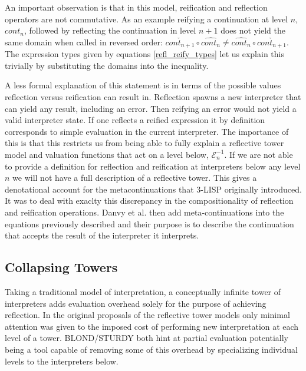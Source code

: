 \documentclass[fleqn]{article}
\theoremstyle{definition}
\begin{document}
An important observation is that in this model, reification and reflection operators are not commutative. As an example reifying a continuation at level $n$, $cont_n$, followed by reflecting the continuation in level $n+1$ does not yield the same domain when called in reversed order: $\check{cont_{n+1}} \circ \hat{cont_n} \neq \hat{cont_n} \circ \check{cont_{n+1}}$. The expression types given by equations \ref{refl_reify_types} let us explain this trivially by substituting the domains into the inequality.

%
%

A less formal explanation of this statement is in terms of the possible values reflection versus reification can result in. Reflection spawns a new interpreter that can yield any result, including an error. Then reifying an error would not yield a valid interpreter state. If one reflects a reified expression it by definition corresponds to simple evaluation in the current interpreter. The importance of this is that this restricts us from being able to fully explain a reflective tower model and valuation functions that act on a level below, $\mathcal{E}^{-1}_n$. If we are not able to provide a definition for reflection and reification at interpreters below any level $n$ we will not have a full description of a reflective tower. This gives a denotational account for the metacontinuations that 3-LISP originally introduced. It was to deal with exaclty this discrepancy in the compositionality of reflection and reification operations. Danvy et al. then add meta-continuations into the equations previously described and their purpose is to describe the continuation that accepts the result of the interpreter it interprets.

\subsection{Collapsing Towers}
Taking a traditional model of interpretation, a conceptually infinite tower of interpreters adds evaluation overhead solely for the purpose of achieving reflection. In the original proposals of the reflective tower models only minimal attention was given to the imposed cost of performing new interpretation at each level of a tower. BLOND/STURDY both hint at partial evaluation potentially being a tool capable of removing some of this overhead by specializing individual levels to the interpreters below.
\end{document}
